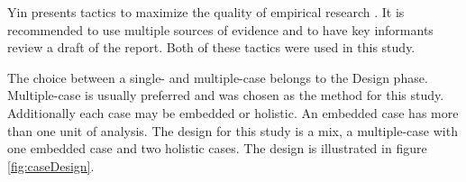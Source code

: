 


Yin presents tactics to maximize the quality of empirical research \cite{CaseStudyResearch}. It is recommended to use multiple sources of evidence and to have key informants review a draft of the report. Both of these tactics were used in this study. %



The choice between a single- and multiple-case belongs to the Design phase. Multiple-case is usually preferred and was chosen as the method for this study. Additionally each case may be embedded or holistic. An embedded case has more than one unit of analysis. The design for this study is a mix, a multiple-case with one embedded case and two holistic cases. %
The design is illustrated in figure \ref{fig:caseDesign}.


